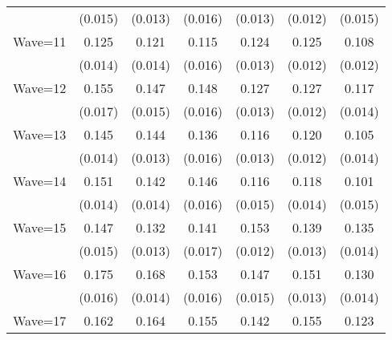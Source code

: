 {\begin{tabular}{l*{6}{c}}
                    &     (0.015)         &     (0.013)         &     (0.016)         &     (0.013)         &     (0.012)         &     (0.015)         \\
Wave=11             &       0.125\sym{***}&       0.121\sym{***}&       0.115\sym{***}&       0.124\sym{***}&       0.125\sym{***}&       0.108\sym{***}\\
                    &     (0.014)         &     (0.014)         &     (0.016)         &     (0.013)         &     (0.012)         &     (0.012)         \\
Wave=12             &       0.155\sym{***}&       0.147\sym{***}&       0.148\sym{***}&       0.127\sym{***}&       0.127\sym{***}&       0.117\sym{***}\\
                    &     (0.017)         &     (0.015)         &     (0.016)         &     (0.013)         &     (0.012)         &     (0.014)         \\
Wave=13             &       0.145\sym{***}&       0.144\sym{***}&       0.136\sym{***}&       0.116\sym{***}&       0.120\sym{***}&       0.105\sym{***}\\
                    &     (0.014)         &     (0.013)         &     (0.016)         &     (0.013)         &     (0.012)         &     (0.014)         \\
Wave=14             &       0.151\sym{***}&       0.142\sym{***}&       0.146\sym{***}&       0.116\sym{***}&       0.118\sym{***}&       0.101\sym{***}\\
                    &     (0.014)         &     (0.014)         &     (0.016)         &     (0.015)         &     (0.014)         &     (0.015)         \\
Wave=15             &       0.147\sym{***}&       0.132\sym{***}&       0.141\sym{***}&       0.153\sym{***}&       0.139\sym{***}&       0.135\sym{***}\\
                    &     (0.015)         &     (0.013)         &     (0.017)         &     (0.012)         &     (0.013)         &     (0.014)         \\
Wave=16             &       0.175\sym{***}&       0.168\sym{***}&       0.153\sym{***}&       0.147\sym{***}&       0.151\sym{***}&       0.130\sym{***}\\
                    &     (0.016)         &     (0.014)         &     (0.016)         &     (0.015)         &     (0.013)         &     (0.014)         \\
Wave=17             &       0.162\sym{***}&       0.164\sym{***}&       0.155\sym{***}&       0.142\sym{***}&       0.155\sym{***}&       0.123\sym{***}\\

\end{tabular}}
